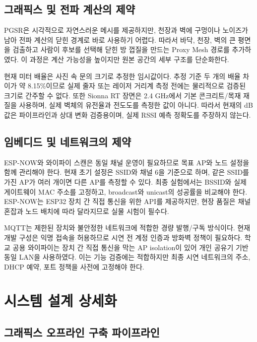 \documentclass[titlepage]{pnureport}
\begin{document}
\section{그래픽스 및 전파 계산의 제약}

PGSR은 시각적으로 자연스러운 메시를 제공하지만, 천장과 벽에 구멍이나 노이즈가 남아 전파 계산의 닫힌 경계로 바로 사용하기 어렵다. 따라서 바닥, 천장, 벽의 큰 평면을 검출하고 사람이 후보를 선택해 닫힌 방 껍질을 만드는 Proxy Mesh 경로를 추가하였다. 이 과정은 계산 가능성을 높이지만 원본 공간의 세부 구조를 단순화한다.

현재 미터 배율은 사진 속 문의 크기로 추정한 임시값이다. 추정 기준 두 개의 배율 차이가 약 8.15\%이므로 실제 줄자 또는 레이저 거리계 측정 전에는 물리적으로 검증된 크기로 간주할 수 없다. 또한 Sionna RT 장면은 2.4 GHz에서 기본 콘크리트/목재 재질을 사용하며, 실제 벽체의 유전율과 전도도를 측정한 값이 아니다. 따라서 현재의 dB 값은 파이프라인과 상대 변화 검증용이며, 실제 RSSI 예측 정확도를 주장하지 않는다.

\section{임베디드 및 네트워크의 제약}

ESP-NOW와 와이파이 스캔은 동일 채널 운영이 필요하므로 목표 AP와 노드 설정을 함께 관리해야 한다. 현재 초기 설정은 SSID와 채널 6을 기준으로 하며, 같은 SSID를 가진 AP가 여러 개이면 다른 AP를 측정할 수 있다. 최종 실험에서는 BSSID와 실제 게이트웨이 MAC 주소를 고정하고, broadcast와 unicast의 성공률을 비교해야 한다. ESP-NOW는 ESP32 장치 간 직접 통신을 위한 API를 제공하지만\cite{espressifEspnow}, 현장 품질은 채널 혼잡과 노드 배치에 따라 달라지므로 실물 시험이 필수다.

MQTT는 제한된 장치와 불안정한 네트워크에 적합한 경량 발행/구독 방식이다\cite{mqttStandard}. 현재 개발 구성은 익명 접속을 허용하므로 시연 전 계정 인증과 방화벽 정책이 필요하다. 학교 공용 와이파이는 장치 간 직접 통신을 막는 AP isolation이 있어 개인 공유기 기반 동일 LAN을 사용하였다. 이는 기능 검증에는 적합하지만 최종 시연 네트워크의 주소, DHCP 예약, 포트 정책을 사전에 고정해야 한다.

\chapter{시스템 설계 상세화}

\section{그래픽스 오프라인 구축 파이프라인}
\end{document}
